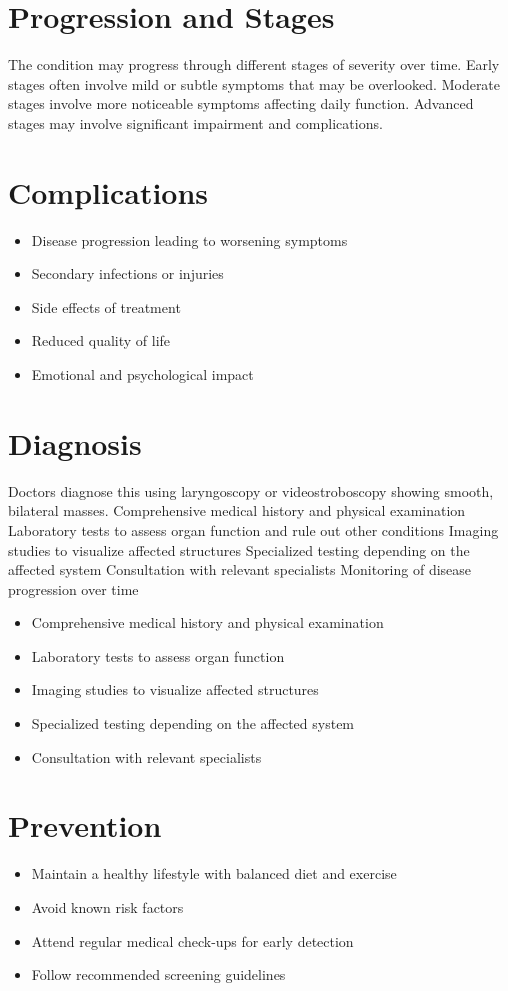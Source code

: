 \section{Progression and Stages}
The condition may progress through different stages of severity over time. Early stages often involve mild or subtle symptoms that may be overlooked. Moderate stages involve more noticeable symptoms affecting daily function. Advanced stages may involve significant impairment and complications.
\section{Complications}
\begin{itemize}[noitemsep]
  \item Disease progression leading to worsening symptoms
  \item Secondary infections or injuries
  \item Side effects of treatment
  \item Reduced quality of life
  \item Emotional and psychological impact
\end{itemize}
\section{Diagnosis}
Doctors diagnose this using laryngoscopy or videostroboscopy showing smooth, bilateral masses. Comprehensive medical history and physical examination Laboratory tests to assess organ function and rule out other conditions Imaging studies to visualize affected structures Specialized testing depending on the affected system Consultation with relevant specialists Monitoring of disease progression over time

\begin{itemize}[noitemsep]
  \item Comprehensive medical history and physical examination
  \item Laboratory tests to assess organ function
  \item Imaging studies to visualize affected structures
  \item Specialized testing depending on the affected system
  \item Consultation with relevant specialists
\end{itemize}
\section{Prevention}
\begin{itemize}[noitemsep]
  \item Maintain a healthy lifestyle with balanced diet and exercise
  \item Avoid known risk factors
  \item Attend regular medical check-ups for early detection
  \item Follow recommended screening guidelines
\end{itemize}
